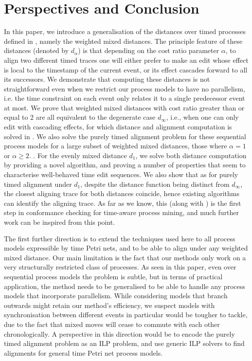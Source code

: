 \documentclass[runningheads]{llncs}
\begin{document}
\section{Perspectives and Conclusion}
\color{firstrevision}
In this paper, we introduce a generalisation of the distances over timed processes defined in \cite{CR22}, namely the weighted mixed distances. 
The principle feature of these distances (denoted by $d_\alpha$) is that depending on the cost ratio parameter $\alpha$, to align two different timed traces one will either prefer to make an edit whose effect is local to the timestamp of the current event, or its effect cascades forward to all its successors. 
We demonstrate that computing these distances is not straightforward even when we restrict our process models to have no parallelism, i.e. the time constraint on each event only relates it to a single predecessor event at most. 
We prove that weighted mixed distances with cost ratio greater than or equal to 2 are all equivalent to the degenerate case $d_{\infty}$, i.e., when one can only edit with cascading effects, for which distance and alignment computation is solved in \cite{CR22}. 
We also solve the purely timed alignment problem for these sequential  process models for a large subset of weighted mixed distances, those where $\alpha = 1$ or $\alpha \geq 2$. . 
For the evenly mixed distance $d_1$, we solve both distance computation by providing a novel algorithm, and proving a number of properties that seem to characterise well-behaved time edit sequences. 
We also show that as for purely timed alignment under $d_1$, despite the distance function being distinct from $d_{\infty}$, the closest aligning trace for both distances coincide, hence existing algorithms can identify the aligning trace.  
As far as we know, this (along with \cite{CR22}) is the first step in conformance checking for time-aware process mining, 
and much further work can be inspired from this point. 

The first further direction is to extend the techniques used here to all process models expressible by time Petri nets, and to be able to align under any weighted mixed distance. 
\color{firstrevision}Our main limitation is the fact that our methods only work on a very structurally restricted class of processes. 
As seen in this paper, even over sequential process models the problem is subtle, but in terms of practical application, the method needs to be generalised to be able to handle any process models that incorporate parallelism. 
While considering models that branch outwards might retain our method's efficiency, we suspect models with synchronisation between different events in particular would be tougher to tackle, due to the fact that mixed moves will cease to commute with each other chronologically. 
A perspective in this direction would be to encode the purely timed alignment problem as an ILP problem, and use generic ILP solvers to find alignments for general time Petri net process models.\color{black}
\end{document}
